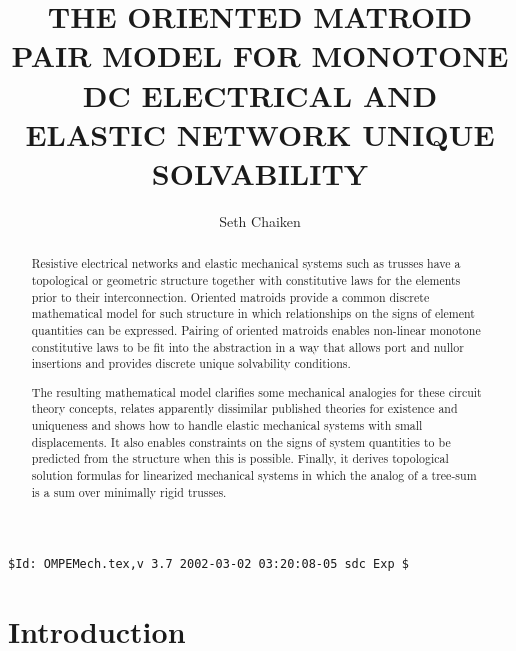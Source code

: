 \documentclass{amsproc-sunycstr}
\title[Oriented Matroid Pair Model]
{\extra{REPORT}
\extra{(\today
:
\the\time)}
THE ORIENTED MATROID PAIR MODEL FOR MONOTONE
DC ELECTRICAL AND ELASTIC NETWORK UNIQUE SOLVABILITY
}
\author{Seth Chaiken}
\theoremstyle{plain}
\theoremstyle{definition}
\theoremstyle{remark}
\newcommand{\extra}[1]{{{#1}}}
\begin{document}
%
%

\begin{abstract}
Resistive electrical networks and elastic mechanical systems such
as trusses have a topological or geometric structure together with constitutive
laws for the elements prior to their interconnection.
Oriented matroids provide a common discrete mathematical model 
for such 
structure
in which relationships on the signs of element 
quantities can be expressed.
Pairing of oriented matroids
enables non-linear monotone constitutive laws to be fit
into the abstraction in a way that allows port and nullor
insertions and provides discrete unique solvability conditions.

The resulting mathematical model clarifies some mechanical analogies for 
these 
circuit theory concepts, 
relates apparently dissimilar published theories
for existence and uniqueness and shows how to 
handle elastic mechanical systems with small displacements.
It also enables constraints on the signs of system quantities
to be predicted from the structure when this is possible.
\extra{Finally, it 
derives topological solution formulas for linearized mechanical 
systems in which the analog of a tree-sum is a sum over minimally rigid
trusses.}
\end{abstract}
%
\maketitle






\begin{center}\verb|$Id: OMPEMech.tex,v 3.7 2002-03-02 03:20:08-05 sdc Exp $|\end{center}

\section{Introduction}
\label{sec:intro}


\end{document}
